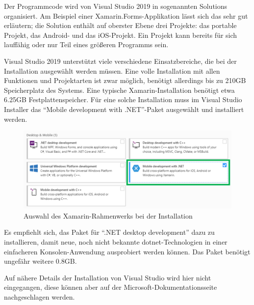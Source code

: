 Der Programmcode wird von Visual Studio 2019 in sogenannten Solutions organisiert.
Am Beispiel einer Xamarin.Forms-Applikation lässt sich das sehr gut erläutern;
die Solution enthält auf oberster Ebene drei Projekte: das portable Projekt, das Android- und das iOS-Projekt.
Ein Projekt kann bereits für sich lauffähig oder nur Teil eines größeren Programms sein.\par

Visual Studio 2019 unterstützt viele verschiedene Einsatzbereiche, die bei der Installation ausgewählt werden müssen.
Eine volle Installation mit allen Funktionen und Projektarten ist zwar möglich, benötigt allerdings bis zu 210GB Speicherplatz des Systems.
Eine typische Xamarin-Installation benötigt etwa 6.25GB Festplattenspeicher.
Für eine solche Installation muss im Visual Studio Installer das \enquote{Mobile development with .NET}-Paket ausgewählt und installiert werden.
\begin{figure}[H]
    \centering\includegraphics[width=0.9\linewidth]{images/auswahl_rahmenwerk/installation.png}    
    \caption{Auswahl des Xamarin-Rahmenwerks bei der Installation}
\end{figure}
Es empfiehlt sich, das Paket für \enquote{.NET desktop development} dazu zu installieren, damit neue, noch nicht bekannte \ac{dotnet}-Technologien in einer einfacheren Konsolen-Anwen\-dung ausprobiert werden können.
Das Paket benötigt ungefähr weitere 0.8GB.\par
Auf nähere Details der Installation von Visual Studio wird hier nicht eingegangen, diese können aber auf der Microsoft-Dokumentationsseite \cite[vgl.][]{msdoc-vs-install} nachgeschlagen werden.
%
